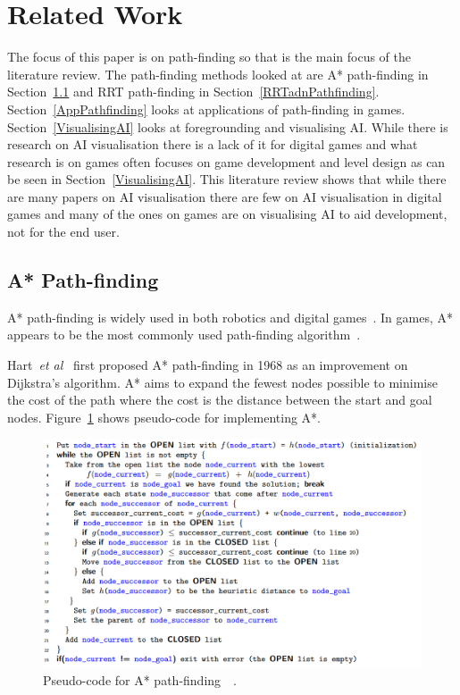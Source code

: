 \documentclass[journal]{IEEEtran}
\begin{document}
	\section{Related Work} \label{RelatedWork}
	The focus of this paper is on path-finding so that is the main focus of the literature review. The path-finding methods looked at are A* path-finding in Section~\ref{A*PF} and RRT path-finding in Section~\ref{RRTadnPathfinding}. Section~\ref{AppPathfinding} looks at applications of path-finding in games. Section~\ref{VisualisingAI} looks at foregrounding and visualising AI. While there is research on AI visualisation there is a lack of it for digital games and what research is on games often focuses on game development and level design as can be seen in Section~\ref{VisualisingAI}. 
	This literature review shows that while there are many papers on AI visualisation there are few on AI visualisation in digital games and many of the ones on games are on visualising AI to aid development, not for the end user.     
	
	\subsection{A* Path-finding} \label{A*PF}
	A* path-finding is widely used in both robotics and digital games~\cite{Algfoor2015}. In games, A* appears to be the most commonly used path-finding algorithm~\cite{Algfoor2015}.
	
	Hart~\textit{et al}~\cite{Hart1968} first proposed A* path-finding in 1968 as an improvement on Dijkstra's algorithm. A* aims to expand the fewest nodes possible to minimise the cost of the path where the cost is the distance between the start and goal nodes. Figure~\ref{A*Pseudo} shows pseudo-code for implementing A*. 
	
	\begin{figure}[h]
		\includegraphics[width=1.0\linewidth]{APseudocode.png}
		\caption{Pseudo-code for A* path-finding~\cite{Hart1968}~\cite{pseudocode:A*}.}
		\label{A*Pseudo}
	\end{figure} 
	
\end{document}
